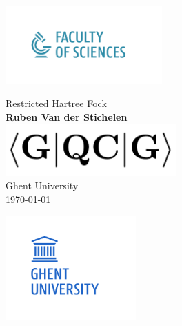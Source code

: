\documentclass[%
    paper=A4,               %
    twoside=true,           %
    openany,              %
    parskip=full,           %
    chapterprefix=true,     %
    11pt,                   %
    headings=normal,        %
    bibliography=totoc,     %
    listof=totoc,           %
    titlepage=on,           %
    captions=tableabove,    %
    draft=false,            %
]{scrreprt}
\title{\reportTitle}
\author{\reportName\\GQCG}
\newcommand{\reportTitle}{\textcolor{ugent_blue}{Restricted Hartree Fock}}
\newcommand{\reportName}{\textbf{Ruben Van der Stichelen}}
\numberwithin{equation}{section}
\begin{document}
    \begin{titlepage}
        \hspace{-1cm}\includegraphics[height=3cm]{faculty.png}
        \begin{center}
            \vspace{2cm}
            \Huge{\reportTitle} \\
            \vspace{1cm}
            \Large{\reportName} \\
            \vspace{2cm}
            \includegraphics[height=2cm]{GQCG.png} \\
            \vspace{0.5cm}
            \large{Ghent University} \\ 
            \large{\today}
        \end{center}
        \vspace{4cm}
        \hspace{-1cm}\includegraphics[height=4cm]{UGent.png}
    \end{titlepage}

    \setcounter{tocdepth}{2}		%

    \setcounter{page}{1}			%
    \pagestyle{maincontentstyle} 	%
\end{document}
